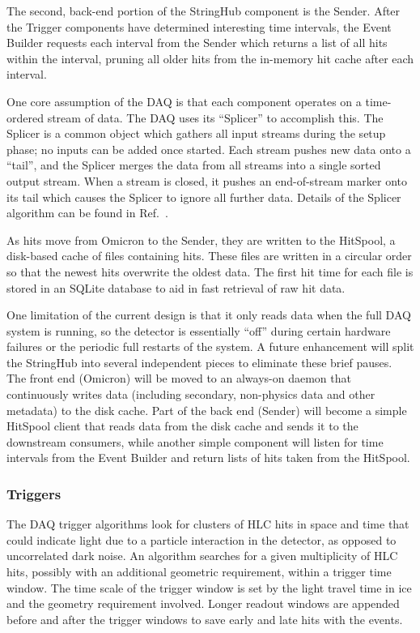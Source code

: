 The second, back-end portion of the StringHub component is the Sender.  After the
Trigger components have determined interesting time intervals, 
the Event Builder requests each interval from the Sender which returns a list of
all hits within the interval, pruning all older hits from the in-memory hit
cache after each interval.

One core assumption of the DAQ is that each component operates on a
time-ordered stream of data.  The DAQ uses its ``Splicer'' to accomplish
this.  The Splicer is a common object which gathers all input streams
during the setup phase; no inputs can be added once started.  Each stream
pushes new data onto a ``tail'', and the Splicer merges the data from all
streams into a single sorted output stream.  When a stream is closed, it
pushes an end-of-stream marker onto its tail which causes the Splicer to
ignore all further data.  Details of the Splicer algorithm can be found in
Ref.~\cite{vlvnt13_trigger}.  

As hits move from Omicron to the Sender, they are written to the
HitSpool, a disk-based cache of files containing hits.  These files are
written in a circular order so that the newest hits overwrite the oldest
data.  The first hit time for each file is stored in an SQLite database to
aid in fast retrieval of raw hit data.

One limitation of the current design is that it only reads data when
the full DAQ system is running, so the detector is essentially ``off''
during certain hardware failures or the periodic full restarts of the system.
A future enhancement 
will split the StringHub into several independent pieces to eliminate these
brief pauses.  The front end (Omicron) will be moved to an always-on daemon
that continuously writes data (including secondary, non-physics data and
other metadata) to the disk cache.  Part of the back end (Sender) 
will become a simple HitSpool client that reads data from the disk cache
and sends it to the downstream consumers, while another simple component
will listen for time intervals from the Event Builder and return lists of
hits taken from the HitSpool.

\subsubsection{\label{sect:online:trigger}Triggers}

The DAQ trigger algorithms look for clusters of HLC hits in space and time
that could indicate light due to a particle interaction in the detector, as
opposed to uncorrelated dark noise.   An algorithm searches for a given
multiplicity of HLC hits, possibly with an additional geometric
requirement, within a trigger time window.  The time scale of the trigger window is
set by the light travel time in ice and the geometry requirement
involved. Longer readout windows are appended before and after the trigger
windows to save early and late hits with the events.

